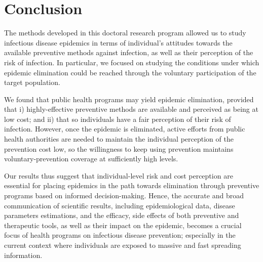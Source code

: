\section{Conclusion}
The methods developed in this doctoral research program allowed us to study infectious disease epidemics in terms of individual's attitudes towards the available preventive methods against infection, as well as their perception of the risk of infection. In particular, we focused on studying the conditions under which epidemic elimination could be reached through the voluntary participation of the target population.

We found that public health programs may yield epidemic elimination, provided that i) highly-effective preventive methods are available and perceived as being at low cost; and ii) that so individuals have a fair perception of their risk of infection. However, once the epidemic is eliminated, active efforts from public health authorities are needed to maintain the individual perception of the prevention cost low, so the willingness to keep using prevention maintains voluntary-prevention coverage at sufficiently high levels.

Our results thus suggest that individual-level risk and cost perception are essential for placing epidemics in the path towards elimination through preventive programs based on informed decision-making. Hence, the accurate and broad communication of scientific results, including epidemiological data, disease parameters estimations, and the efficacy, side effects of both preventive and therapeutic tools, as well as their impact on the epidemic, becomes a crucial focus of health programs on infectious disease prevention; especially in the current context where individuals are exposed to massive and fast spreading information. 